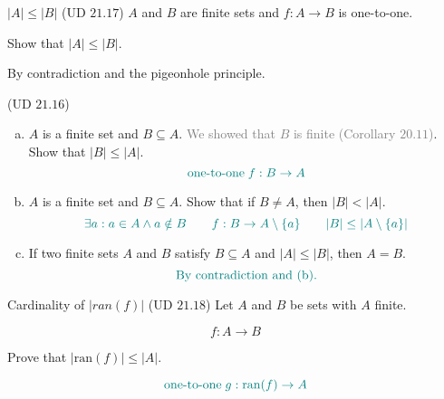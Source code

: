 \begin{frame}{}
  \begin{exampleblock}{$|A| \le |B|$ (UD $21.17$)}
    $A$ and $B$ are finite sets and $f: A \to B$ is one-to-one. 
    
    Show that $|A| \le |B|$.
  \end{exampleblock}

  \pause
  \vspace{0.60cm}
  \centerline{By contradiction and the pigeonhole principle.}
\end{frame}

\begin{frame}{}
  \begin{exampleblock}{(UD $21.16$)}
    \begin{enumerate}[(a)]
      \item $A$ is a finite set and $B \subseteq A$. \textcolor{gray}{We showed that $B$ is finite (Corollary $20.11$)}. Show that $|B| \le |A|$.
	\pause
	\[
	  \textcolor{teal}{\text{one-to-one} \;f: B \to A}
	\]
      \item \pause $A$ is a finite set and $B \subseteq A$. Show that if $B \neq A$, then $|B| < |A|$.
	\pause
	\[
	  \textcolor{teal}{\exists a: a \in A \land a \notin B \qquad f: B \to A \setminus \{a\} \qquad |B| \le |A \setminus \{a\}|}
	\]
      \item \pause If two finite sets $A$ and $B$ satisfy $B \subseteq A$ and $|A| \le |B|$, then $A = B$.
	\pause
	\[
	  \textcolor{teal}{\text{By contradiction and (b).}}
	\]
    \end{enumerate}
  \end{exampleblock}
\end{frame}

\begin{frame}{}
  \begin{exampleblock}{Cardinality of $|ran(f)|$ (UD $21.18$)}
    Let $A$ and $B$ be sets with $A$ finite.

    \[
      f: A \to B
    \]

    Prove that $|\text{ran}(f)| \le |A|$.
  \end{exampleblock}

  \pause
  \vspace{0.50cm}
  \[
    \textcolor{teal}{\text{one-to-one} \;g: \text{ran}(f) \to A}
  \]
  \pause
  \centerline{}
\end{frame}


